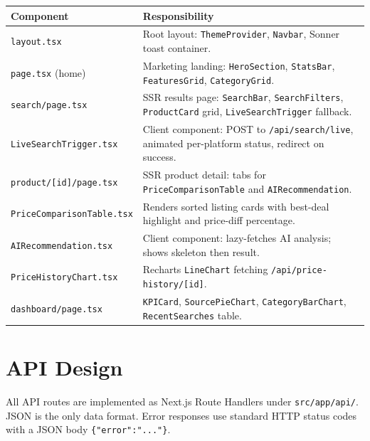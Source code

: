 \documentclass[12pt,a4paper]{report}
\begin{document}
\begin{longtable}{L{4.5cm} L{8.5cm}}
  \toprule
  \textbf{Component} & \textbf{Responsibility} \\
  \midrule
  \endhead
  \texttt{layout.tsx} &
    Root layout: \texttt{ThemeProvider}, \texttt{Navbar},
    Sonner toast container. \\[3pt]
  \texttt{page.tsx} (home) &
    Marketing landing: \texttt{HeroSection}, \texttt{StatsBar},
    \texttt{FeaturesGrid}, \texttt{CategoryGrid}. \\[3pt]
  \texttt{search/page.tsx} &
    SSR results page: \texttt{SearchBar}, \texttt{SearchFilters},
    \texttt{ProductCard} grid, \texttt{LiveSearchTrigger} fallback. \\[3pt]
  \texttt{LiveSearchTrigger.tsx} &
    Client component: POST to \texttt{/api/search/live}, animated
    per-platform status, redirect on success. \\[3pt]
  \texttt{product/{[}id{]}/page.tsx} &
    SSR product detail: tabs for \texttt{PriceComparisonTable}
    and \texttt{AIRecommendation}. \\[3pt]
  \texttt{PriceComparisonTable.tsx} &
    Renders sorted listing cards with best-deal highlight
    and price-diff percentage. \\[3pt]
  \texttt{AIRecommendation.tsx} &
    Client component: lazy-fetches AI analysis; shows skeleton then result. \\[3pt]
  \texttt{PriceHistoryChart.tsx} &
    Recharts \texttt{LineChart} fetching
    \texttt{/api/price-history/[id]}. \\[3pt]
  \texttt{dashboard/page.tsx} &
    \texttt{KPICard}, \texttt{SourcePieChart}, \texttt{CategoryBarChart},
    \texttt{RecentSearches} table. \\
  \bottomrule
\end{longtable}

\chapter{API Design}

All API routes are implemented as Next.js Route Handlers under
\texttt{src/app/api/}. JSON is the only data format. Error responses use
standard HTTP status codes with a JSON body \texttt{\{"error":"..."\}}.
\end{document}
